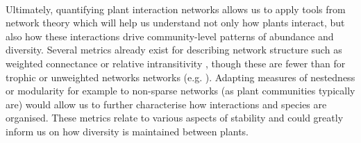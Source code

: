 \documentclass[a4,12pt]{article}
\begin{document}
        \paragraph{}
        Ultimately, quantifying plant interaction networks allows us to apply tools from network theory which will help us understand not only how plants interact, but also how these interactions drive community-level patterns of abundance and diversity. Several metrics already exist for describing network structure such as weighted connectance \parencite{Ulanowicz1991} or relative intransitivity \parencite{Laird2006a}, though these are fewer than for trophic or unweighted networks networks (e.g. \cite{Bersier2002, Delmas2019}). Adapting measures of nestedness or modularity for example to non-sparse networks (as plant communities typically are) would allow us to further characterise how interactions and species are organised. These metrics relate to various aspects of stability and could greatly inform us on how diversity is maintained between plants. 







% 
% 

\newpage
\end{document}
